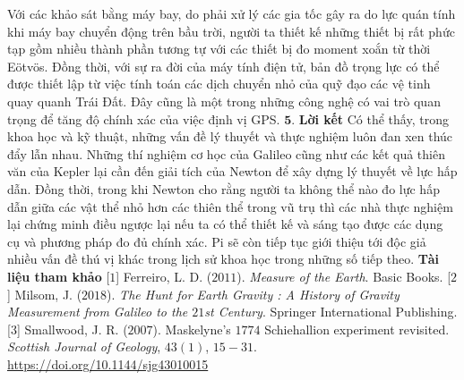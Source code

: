 \begin{multicols}{2}
	Với các khảo sát bằng máy bay, do phải xử lý các gia tốc gây ra do lực quán tính khi máy bay chuyển động trên bầu trời, người ta thiết kế những thiết bị rất phức tạp gồm nhiều thành phần tương tự với các thiết bị đo moment xoắn từ thời Eötvös. Đồng thời, với sự ra đời của máy tính điện tử, bản đồ trọng lực có thể được thiết lập từ việc tính toán các dịch chuyển nhỏ của quỹ đạo các vệ tinh quay quanh Trái Đất. Đây cũng là một trong những công nghệ có vai trò quan trọng để tăng độ chính xác của việc định vị GPS.
	\vskip 0.1cm
	$\pmb{5.}$ \textbf{\color{timhieukhoahoc}Lời kết}
	\vskip 0.1cm
	Có thể thấy, trong khoa học và kỹ thuật, những vấn đề lý thuyết và thực nghiệm luôn đan xen thúc đẩy lẫn nhau. Những thí nghiệm cơ học của Galileo cũng như các kết quả thiên văn của Kepler lại cần đến giải tích của Newton để xây dựng lý thuyết về lực hấp dẫn. Đồng thời, trong khi Newton cho rằng người ta không thể nào đo lực hấp dẫn giữa các vật thể nhỏ hơn các thiên thể trong vũ trụ thì các nhà thực nghiệm lại chứng minh điều ngược lại nếu ta có thể thiết kế và sáng tạo được các dụng cụ và phương pháp đo đủ chính xác. Pi sẽ còn tiếp tục giới thiệu tới độc giả nhiều vấn đề thú vị khác trong lịch sử khoa học trong những số tiếp theo.
	\vskip 0.1cm
	\vskip 0.1cm
	\textbf{\color{timhieukhoahoc}Tài liệu tham khảo}
	\vskip 0.1cm
	[$1$] Ferreiro, L. D. ($2011$). \textit{Measure of the Earth}. Basic Books.
	\vskip 0.1cm
	[$2$] Milsom, J. ($2018$). \textit{The Hunt for Earth Gravity : A History of Gravity Measurement from Galileo to the $21$st Century}. Springer International Publishing.
	\vskip 0.1cm
	[$3$] Smallwood, J. R. ($2007$). Maskelyne's $1774$ Schiehallion experiment revisited. \textit{Scottish Journal of Geology}, $43(1)$, $15-31$. \url{https://doi.org/10.1144/sjg43010015}
\end{multicols}


